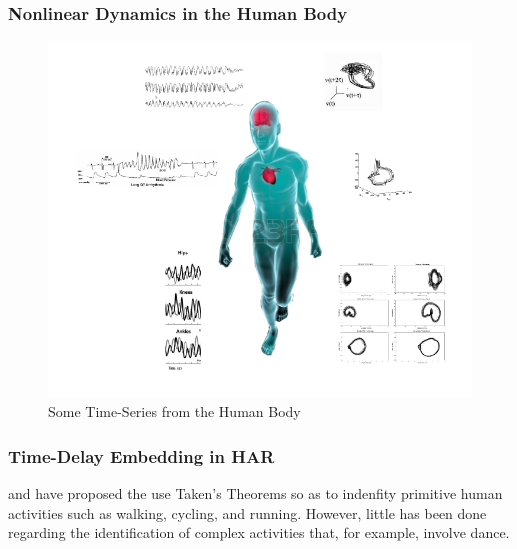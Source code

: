 \documentclass{beamer}
\theoremstyle{definition}
\begin{document}
\begin{frame}
\frametitle{Nonlinear Dynamics in the Human Body}

\begin{figure}
\includegraphics[scale=.3]{timeserieshumanbody}
\centering 
\caption{Some Time-Series from the Human Body}
\end{figure}
\end{frame}


\begin{bibunit}[apalike]
\begin{frame}
\frametitle{Time-Delay Embedding in HAR}

\cite{Jordan2010} and \cite{Sama2013} have proposed the use Taken's Theorems
so as to indenfity primitive human activities such as walking, cycling, and 
running. However, little has been done regarding the identification of
complex activities that, for example, involve dance.

    \vfill
\end{frame}
\end{bibunit}
\end{document}
